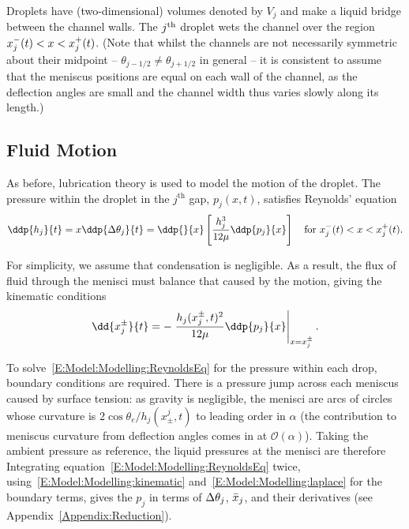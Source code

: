 Droplets have (two-dimensional) volumes denoted by $V_j$ and make a liquid bridge between the channel walls. The $j^{\text{th}}$ droplet wets the channel over the region $x_{j}^{-}(t)< x < x_{j}^{+}(t)$. (Note that whilst the channels are not necessarily symmetric about their midpoint -- $\theta_{j-1/2} \neq \theta_{j+1/2}$ in general -- it is consistent to assume that the meniscus positions are equal on each wall of the channel, as the deflection angles are small and the channel width thus varies slowly along its length.)

\subsection{Fluid Motion}
As before, lubrication theory is used to model the motion of the droplet. The pressure within the droplet in the $j^{\text{th}}$ gap, $p_j(x,t)$, satisfies Reynolds' equation~\citep{Leal2007}
\begin{equation}\label{E:Model:Modelling:ReynoldsEq}
 \ddp{h_j}{t}= x \ddp{\dthetaj}{t}= \ddp{}{x}\left[\frac{h_j^3}{12 \mu}\ddp{p_j}{x}\right] \quad \text{for} ~\xleftj(t)< x <\xrightj(t).
\end{equation}

For simplicity, we assume that condensation is negligible. As a result,  the flux of fluid through the menisci must balance that caused by the motion, giving the kinematic conditions
\begin{equation}\label{E:Model:Modelling:kinematic}
\dd{x^{\pm}_j}{t} = -\left.\frac{h_j(x_j^{\pm},t)^2}{12\mu}\ddp{p_{j}}{x}\right|_{x = x^{\pm}_j}.
\end{equation}

To solve~\eqref{E:Model:Modelling:ReynoldsEq} for the pressure within each drop, boundary conditions are required. There is a pressure jump across each meniscus caused by surface tension: as gravity is negligible, the menisci are arcs of circles whose curvature is $ 2\cos \theta_e/h_{j}(x_{\pm}^j,t)$ to leading order in $\alpha$ (the contribution to meniscus curvature from deflection angles comes in at $\mathcal{O}(\alpha)$). Taking the ambient pressure as reference, the liquid pressures at the menisci are therefore
Integrating equation~\eqref{E:Model:Modelling:ReynoldsEq} twice, using~\eqref{E:Model:Modelling:kinematic} and~\eqref{E:Model:Modelling:laplace} for the boundary terms, gives the $p_j$ in terms of $\Delta \theta_j$, $\bar{x}_j$, and their derivatives (see Appendix~\ref{Appendix:Reduction}).

